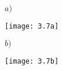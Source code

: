 \begin{description}
$a)$

\begin{center}
	\texttt{[image: 3.7a]}
\end{center}

$b)$

\begin{center}
	\texttt{[image: 3.7b]}
\end{center}


%
%
%
%
%
%
%
%
%
%
%
%
%
%
%
%
%
%
%
%
%
%
%
%
%
%
%
%
%
%
%
%
%
%
%
%
%
%
%
%
%
%
%
%
%
%
%
%
%


\end{description}
